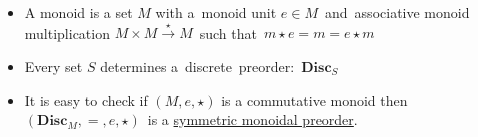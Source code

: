 \begin{itemize}
    \item A monoid is a set $M$ with a \,monoid unit $e \in M$\, and \,associative monoid multiplication $M \times M \xrightarrow{\star} M$\, such that \,$m \star e=m=e \star m$\,
    \item Every set $S$ determines a \,discrete\, preorder: \,$\mathbf{Disc}_S$\,
    \item It is easy to check if $(M,e,\star)$ is a commutative monoid then \,$(\mathbf{Disc}_M, =, e, \star)$\, is a \hyperref[D2.2]{symmetric monoidal preorder}.
  \end{itemize}